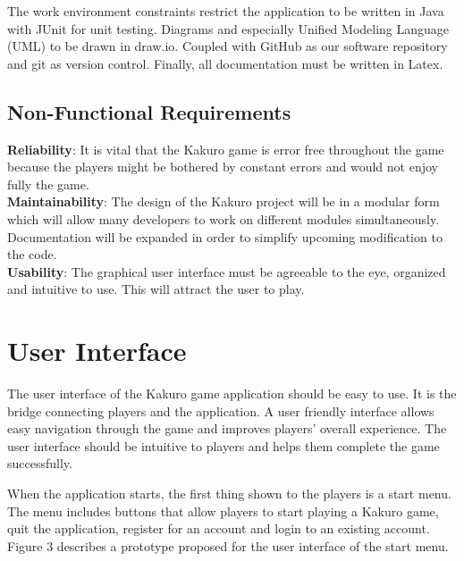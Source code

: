 \documentclass[12pt]{article}
\begin{document}
The work environment constraints restrict the application to be written in Java with JUnit for unit testing. Diagrams and especially Unified Modeling Language (UML) to be drawn in draw.io. Coupled with GitHub as our software repository and git as version control. Finally, all documentation must be written in Latex. 
 

\subsection{Non-Functional Requirements}
 
\textbf{Reliability}: It is vital that the Kakuro game is error free throughout the game because the players might be bothered by constant errors and would not enjoy fully the game.\\

\textbf{Maintainability}: The design of the Kakuro project will be in a modular form which will allow many developers to work on different modules simultaneously. Documentation will be expanded in order to simplify upcoming modification to the code. \\

\textbf{Usability}: The graphical user interface must be agreeable to the eye, organized and intuitive to
use. This will attract the user to play. \\

\newpage


\section{User Interface}

The user interface of the Kakuro game application should be easy to use. It is the bridge connecting players and the application. A user friendly interface allows easy navigation through the game and improves players' overall experience. The user interface should be intuitive to players and helps them complete the game successfully.

When the application starts, the first thing shown to the players is a start menu. The menu includes buttons that allow players to start playing a Kakuro game, quit the application, register for an account and login to an existing account. Figure 3 describes a prototype proposed for the user interface of the start menu. 
\end{document}
